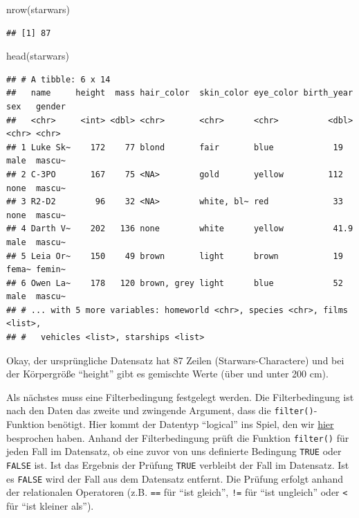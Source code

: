 \documentclass[
]{book}
\newenvironment{Shaded}{\begin{snugshade}}{\end{snugshade}}
\newcommand{\FunctionTok}[1]{\textcolor[rgb]{0.00,0.00,0.00}{#1}}
\newcommand{\NormalTok}[1]{#1}
\begin{document}
\begin{Shaded}
\begin{Highlighting}[]
\FunctionTok{nrow}\NormalTok{(starwars)}
\end{Highlighting}
\end{Shaded}

\begin{verbatim}
## [1] 87
\end{verbatim}

\begin{Shaded}
\begin{Highlighting}[]
\FunctionTok{head}\NormalTok{(starwars)}
\end{Highlighting}
\end{Shaded}

\begin{verbatim}
## # A tibble: 6 x 14
##   name     height  mass hair_color  skin_color eye_color birth_year sex   gender
##   <chr>     <int> <dbl> <chr>       <chr>      <chr>          <dbl> <chr> <chr> 
## 1 Luke Sk~    172    77 blond       fair       blue            19   male  mascu~
## 2 C-3PO       167    75 <NA>        gold       yellow         112   none  mascu~
## 3 R2-D2        96    32 <NA>        white, bl~ red             33   none  mascu~
## 4 Darth V~    202   136 none        white      yellow          41.9 male  mascu~
## 5 Leia Or~    150    49 brown       light      brown           19   fema~ femin~
## 6 Owen La~    178   120 brown, grey light      blue            52   male  mascu~
## # ... with 5 more variables: homeworld <chr>, species <chr>, films <list>,
## #   vehicles <list>, starships <list>
\end{verbatim}

Okay, der ursprüngliche Datensatz hat 87 Zeilen (Starwars-Charactere) und bei der Körpergröße ``height'' gibt es gemischte Werte (über und unter 200 cm).

Als nächstes muss eine Filterbedingung festgelegt werden. Die Filterbedingung ist nach den Daten das zweite und zwingende Argument, dass die \texttt{filter()}-Funktion benötigt. Hier kommt der Datentyp ``logical'' ins Spiel, den wir \protect\hyperlink{atomic_vector_types}{hier} besprochen haben. Anhand der Filterbedingung prüft die Funktion \texttt{filter()} für jeden Fall im Datensatz, ob eine zuvor von uns definierte Bedingung \texttt{TRUE} oder \texttt{FALSE} ist. Ist das Ergebnis der Prüfung \texttt{TRUE} verbleibt der Fall im Datensatz. Ist es \texttt{FALSE} wird der Fall aus dem Datensatz entfernt. Die Prüfung erfolgt anhand der relationalen Operatoren (z.B. \texttt{==} für ``ist gleich'', \texttt{!=} für ``ist ungleich'' oder \texttt{\textless{}} für ``ist kleiner als'').
\end{document}
